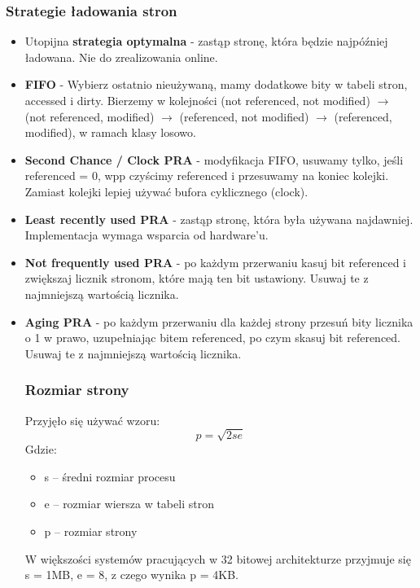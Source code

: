 \subsubsection{Strategie ładowania stron}
\begin{itemize}
	\item Utopijna \textbf{strategia optymalna} - zastąp stronę, która będzie najpóźniej ładowana. Nie do zrealizowania online.
	\item \textbf{FIFO} - Wybierz ostatnio nieużywaną, mamy dodatkowe bity w tabeli stron, accessed i dirty. Bierzemy w kolejności (not referenced, not modified) \(\rightarrow\) (not referenced, modified) \(\rightarrow\) (referenced, not modified) \(\rightarrow\) (referenced, modified), w ramach klasy losowo.
	\item \textbf{Second Chance / Clock PRA} - modyfikacja FIFO, usuwamy tylko, jeśli referenced = 0, wpp czyścimy referenced i przesuwamy na koniec kolejki. Zamiast kolejki lepiej używać bufora cyklicznego (clock).
	\item \textbf{Least recently used PRA} - zastąp stronę, która była używana najdawniej. Implementacja wymaga wsparcia od hardware'u.
	\item \textbf{Not frequently used PRA} - po każdym przerwaniu kasuj bit referenced i zwiększaj licznik stronom, które mają ten bit ustawiony. Usuwaj te z najmniejszą wartością licznika.
	\item \textbf{Aging PRA} - po każdym przerwaniu dla każdej strony przesuń bity licznika o 1 w prawo, uzupełniając bitem referenced, po czym skasuj bit referenced. Usuwaj te z najmniejszą wartością licznika.
	      \subsubsection{Rozmiar strony}
	      Przyjęło się używać wzoru:
	      \begin{equation*}
		      p = \sqrt{2se}
	      \end{equation*}
	      Gdzie:
	      \begin{itemize}
		      \item s -- średni rozmiar procesu
		      \item e -- rozmiar wiersza w tabeli stron
		      \item p -- rozmiar strony
	      \end{itemize}
	      W większości systemów pracujących w 32 bitowej architekturze przyjmuje się s = 1MB, e = 8, z czego wynika p = 4KB.
\end{itemize}
